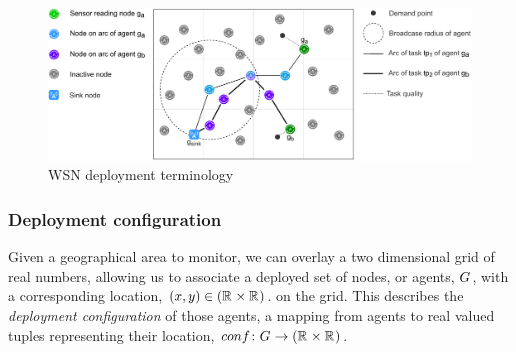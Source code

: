 \newcommand{\varLocation}[2]{\varSymbol{loc}{#1}{#2}}
\newcommand{\setLocation}[2]{\setSymbol{LOC}{#1}{#2}}
\newcommand{\formalVarLocation}[2]{(x,y)}
\newcommand{\formalSetLocation}[2]{(\setRealNumbers{}{} \times \setRealNumbers{}{})}

\newcommand{\functionDeployment}[2]{\functionSignature{conf}{\setAgents{}{}}}
\newcommand{\formalDeployment}[2]{\functionFormal{conf}{\setAgents{}{}}{(\setRealNumbers{}{} \times \setRealNumbers{}{})}}
\newcommand{\functionTaskArc}[2]{\functionSignature{arc}{\varAtomicTask{}{}}}
\newcommand{\formalTaskArc}[2]{\functionFormal{arc}{\setAtomicTask{}{}}{\powerSetAgents{}{}}}
\newcommand{\functionTaskDemandPoint}[2]{\functionSignature{dp}{\varAtomicTask{}{}}}
\newcommand{\formalTaskDemandPoint}[2]{\functionFormal{dp}{\setAtomicTask{}{}}{(\setRealNumbersNonNegative{}{} \times \setRealNumbersNonNegative)}}
\newcommand{\varActiveAgent}[2]{\varAgent{#1}{\oplus}}
\newcommand{\varInactiveAgent}[2]{\varAgent{#1}{\ominus}}
\newcommand{\varSensingAgent}[2]{\varAgent{#1}{\ast}}
\newcommand{\varSinkAgent}[2]{\varAgent{#1}{\Delta}}

\newcommand{\varEnergy}[2]{\varSymbol{e}{#1}{#2}}
\newcommand{\setEnergy}[2]{\setSymbol{E}{#1}{#2}}



\begin{figure}
\centering 
\includegraphics[width=0.9\linewidth]{grid_concept}
\caption[WSN deployment terminology]{WSN deployment terminology}
\label{fig:gridconcept}
\end{figure}

\subsubsection*{Deployment configuration}
Given a geographical area to monitor, we can overlay a two dimensional grid of real numbers, allowing us to associate a deployed set of nodes, or agents, $G_{}^{}$, with a corresponding location, $\formalVarLocation{}{} \in \formalSetLocation{}{}$. on the grid. This describes the \textit{deployment configuration} of those agents, a mapping from agents to real valued tuples representing their location,  $\formalDeployment{}{}$.


